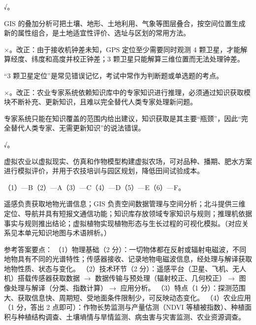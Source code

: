 \documentclass[a4paper,11pt]{article}
\begin{document}
\q √。\begin{analysis}GIS 的叠加分析可把土壤、地形、土地利用、气象等图层叠合，按空间位置生成新的属性组合，是土地适宜性评价、选址与区划的常用方法。\end{analysis}

\q ×。改正：由于接收机钟差未知，GPS 定位至少需要同时观测 4 颗卫星，才能解算经度、纬度和高度并校正钟差；3 颗卫星只能解算三维位置而无法处理钟差。\begin{analysis}“3 颗卫星定位”是常见错误记忆，考试中常作为判断题或单选题的考点。\end{analysis}

\q ×。改正：农业专家系统依赖知识库中的专家知识进行推理，必须通过知识获取模块不断补充、更新知识，且难以完全替代人类专家处理新问题。\begin{analysis}专家系统只能在知识覆盖的范围内给出建议，知识获取是其主要“瓶颈”，因此“完全替代人类专家、无需更新知识”的说法错误。\end{analysis}

\q √。\begin{analysis}虚拟农业以虚拟现实、仿真和作物模型构建虚拟农场，可对品种、播期、肥水方案进行模拟评价，并用于农技培训与园区规划，降低田间试验成本。\end{analysis}


\q （1）—B\quad （2）—A\quad （3）—C\quad （4）—D\quad （5）—E\quad （6）—F。
\begin{analysis}遥感负责获取地物光谱信息；GIS 负责空间数据管理与空间分析；北斗提供三维定位、导航并具有短报文通信功能；知识库存放领域专家知识与规则；推理机依据事实与规则推出结论；虚拟植物实现植物形态与生长过程的可视化模拟。（对应关系见本单元知识地图与术语辨析。）\end{analysis}


\q 参考答案要点：
（1）物理基础（2 分）：一切物体都在反射或辐射电磁波，不同地物具有不同的光谱特性；传感器接收、记录地物电磁波信息，经处理与解译获取地物性质、状态与变化。
（2）技术环节（2 分）：遥感平台（卫星、飞机、无人机）搭载传感器获取数据 $\rightarrow$ 数据传输与预处理（辐射校正、几何校正）$\rightarrow$ 图像处理与解译（分类、指数计算）$\rightarrow$ 应用分析。
（3）特点（1 分）：探测范围大、获取信息快、周期短、受地面条件限制少，可反映动态变化。
（4）农业应用（1 分，答出 2 点即可）：作物长势监测与产量估测（NDVI 等植被指数）、种植面积与种植结构调查、土壤墒情与旱情监测、病虫害与灾害监测、农业资源调查。
\end{document}
